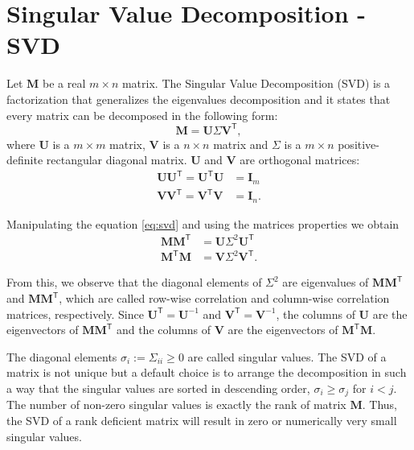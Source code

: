 \appendix

\chapter{Singular Value Decomposition - SVD}\label{appendix:svd}

Let $\mathbf{M}$ be a real $m \times n$ matrix. The Singular Value Decomposition (SVD) is a factorization that generalizes the eigenvalues decomposition and it states that every matrix can be decomposed in the following form:
\begin{equation}
    \mathbf{M} = \mathbf{U} \Sigma \mathbf{V}^{\mathsf{T}},
    \label{eq:svd}
\end{equation}
where $\mathbf{U}$ is a $m \times m$ matrix, $\mathbf{V}$ is a $n \times n$ matrix and $\Sigma$ is a $m \times n$ positive-definite rectangular diagonal matrix. $\mathbf{U}$ and $\mathbf{V}$ are orthogonal matrices:
\begin{align}
    \mathbf{U}\mathbf{U}^{\mathsf{T}} = \mathbf{U}^{\mathsf{T}}\mathbf{U} &= \mathbf{I}_{m} \\
    \mathbf{V}\mathbf{V}^{\mathsf{T}} = \mathbf{V}^{\mathsf{T}}\mathbf{V} &= \mathbf{I}_{n}. 
\end{align}

Manipulating the equation \eqref{eq:svd} and using the matrices properties we obtain
\begin{align}
    \mathbf{M}\mathbf{M}^{\mathsf{T}} &= \mathbf{U} \Sigma^2 \mathbf{U}^{\mathsf{T}} \\
    \mathbf{M}^{\mathsf{T}}\mathbf{M} &=  \mathbf{V} \Sigma^2 \mathbf{V}^{\mathsf{T}}.
\end{align}

From this, we observe that the diagonal elements of $\Sigma^2$ are eigenvalues of $\mathbf{M}\mathbf{M}^{\mathsf{T}}$ and $\mathbf{M}\mathbf{M}^{\mathsf{T}}$, which are called row-wise correlation and column-wise correlation matrices, respectively. Since $\mathbf{U}^{\mathsf{T}} = \mathbf{U}^{-1}$ and $\mathbf{V}^{\mathsf{T}} = \mathbf{V}^{-1}$, the columns of $\mathbf{U}$ are the eigenvectors of $\mathbf{M}\mathbf{M}^{\mathsf{T}}$ and the columns of $\mathbf{V}$ are the eigenvectors of $\mathbf{M}^{\mathsf{T}}\mathbf{M}$.

The diagonal elements $\sigma_i := \Sigma_{ii} \geq 0$ are called singular values. The SVD of a matrix is not unique but a default choice is to arrange the decomposition in such a way that the singular values are sorted in descending order, $\sigma_i \geq \sigma_j$ for $i < j$. The number of non-zero singular values is exactly the rank of matrix $\mathbf{M}$. Thus, the SVD of a rank deficient matrix will result in zero or numerically very small singular values. 

